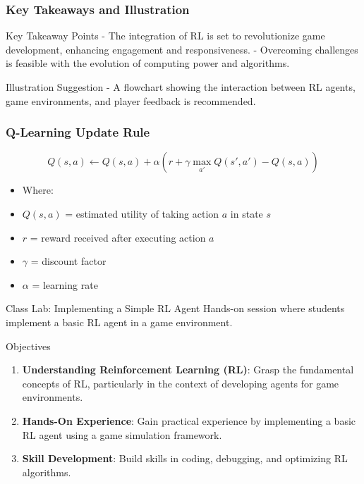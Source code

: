 \documentclass[aspectratio=169]{beamer}
\begin{document}
\begin{frame}[fragile]
    \frametitle{Key Takeaways and Illustration}
    \begin{block}{Key Takeaway Points}
        - The integration of RL is set to revolutionize game development, enhancing engagement and responsiveness.
        - Overcoming challenges is feasible with the evolution of computing power and algorithms.
    \end{block}
    \begin{block}{Illustration Suggestion}
        - A flowchart showing the interaction between RL agents, game environments, and player feedback is recommended.
    \end{block}
\end{frame}

\begin{frame}[fragile]
    \frametitle{Q-Learning Update Rule}
    \begin{equation}
        Q(s, a) \leftarrow Q(s, a) + \alpha \left( r + \gamma \max_{a'} Q(s', a') - Q(s, a) \right)
    \end{equation}
    \begin{itemize}
        \item Where:
        \item \( Q(s, a) \) = estimated utility of taking action \( a \) in state \( s \)
        \item \( r \) = reward received after executing action \( a \)
        \item \( \gamma \) = discount factor
        \item \( \alpha \) = learning rate
    \end{itemize}
\end{frame}

\begin{frame}{Class Lab: Implementing a Simple RL Agent}
    Hands-on session where students implement a basic RL agent in a game environment.
\end{frame}

\begin{frame}{Objectives}
    \begin{enumerate}
        \item \textbf{Understanding Reinforcement Learning (RL)}: Grasp the fundamental concepts of RL, particularly in the context of developing agents for game environments.
        \item \textbf{Hands-On Experience}: Gain practical experience by implementing a basic RL agent using a game simulation framework.
        \item \textbf{Skill Development}: Build skills in coding, debugging, and optimizing RL algorithms.
    \end{enumerate}
\end{frame}
\end{document}
